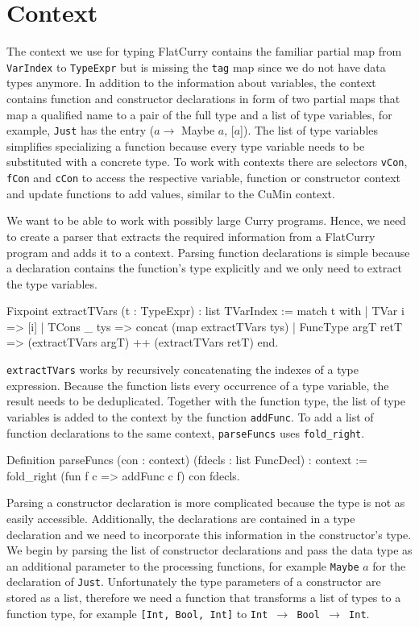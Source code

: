 \documentclass[paper = a4, fleqn, abstract=on, twoside]{scrreprt}
\newcommand{\coqinline}[1]{\texttt{#1}}
\begin{document}
\section{Context}
\label{context}
The context we use for typing FlatCurry contains the familiar partial map from \coqinline{VarIndex} to \coqinline{TypeExpr} but is missing the \coqinline{tag} map since we do not have data types anymore. In addition to the information about variables, the context contains function and constructor declarations in form of two partial maps that map a qualified name to a pair of the full type and a list of type variables, for example, \texttt{Just} has the entry ($a \rightarrow$ Maybe $a$, [$a$]). The list of type variables simplifies specializing a function because every type variable needs to be substituted with a concrete type. To work with contexts there are selectors \coqinline{vCon}, \coqinline{fCon} and \coqinline{cCon} to access the respective variable, function or constructor context and update functions to add values, similar to the CuMin context.\\
\par \noindent
We want to be able to work with possibly large Curry programs. Hence, we need to create a parser that extracts the required information from a FlatCurry program and adds it to a context. Parsing function declarations is simple because a declaration contains the function's type explicitly and we only need to extract the type variables.
\begin{coqcode}
Fixpoint extractTVars (t : TypeExpr) : list TVarIndex :=
  match t with
  | TVar i      => [i]
  | TCons _ tys => concat (map extractTVars tys)
  | FuncType argT retT => (extractTVars argT) ++ (extractTVars retT)
  end.
\end{coqcode}
\coqinline{extractTVars} works by recursively concatenating the indexes of a type expression. Because the function lists every occurrence of a type variable, the result needs to be deduplicated. Together with the function type, the list of type variables is added to the context by the function \texttt{addFunc}. To add a list of function declarations to the same context, \texttt{parseFuncs} uses \coqinline{fold_right}.
\begin{coqcode}
Definition parseFuncs (con : context) (fdecls : list FuncDecl) : context :=
  fold_right (fun f c => addFunc c f) con fdecls.
\end{coqcode}
\par \noindent
Parsing a constructor declaration is more complicated because the type is not as easily accessible. Additionally, the declarations are contained in a type declaration and we need to incorporate this information in the constructor's type. We begin by parsing the list of constructor declarations and pass the data type as an additional parameter to the processing functions, for example \texttt{Maybe} $a$ for the declaration of \texttt{Just}. Unfortunately the type parameters of a constructor are stored as a list, therefore we need a function that transforms a list of types to a function type, for example \texttt{[Int, Bool, Int]} to \mbox{\texttt{Int $\rightarrow$ Bool $\rightarrow$ Int}}.
\end{document}
